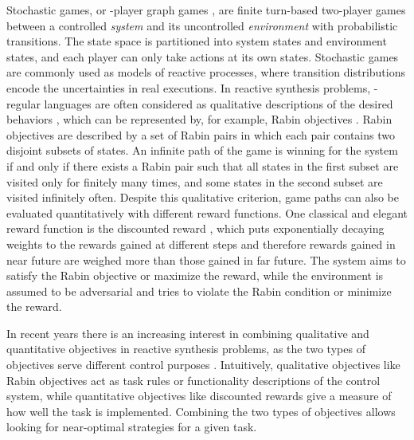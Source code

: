 \documentclass[runningheads,a4paper]{llncs}
\begin{document}
Stochastic games, or -player graph games \cite{chatterjee2012survey}, are finite turn-based two-player games between a controlled \emph{system} and its uncontrolled \emph{environment} with probabilistic transitions. The state space is partitioned into system states and environment states, and each player can only take actions at its own states. Stochastic games are commonly used as models of reactive processes, where transition distributions encode the uncertainties in real executions. In reactive synthesis problems, -regular languages are often considered as qualitative descriptions of the desired behaviors \cite{kress2007s}, which can be represented by, for example, Rabin objectives \cite{thomas1997languages}. Rabin objectives are described by a set of Rabin pairs in which each pair contains two disjoint subsets of states. An infinite path of the game is winning for the system if and only if there exists a Rabin pair such that all states in the first subset are visited only for finitely many times, and some states in the second subset are visited infinitely often. Despite this qualitative criterion, game paths can also be evaluated quantitatively with different reward functions. One classical and elegant reward function is the discounted reward \cite{shapley1953stochastic, littman1994markov, filar1996competitive}, which puts exponentially decaying weights to the rewards gained at different steps and therefore rewards gained in near future are weighed more than those gained in far future. The system aims to satisfy the Rabin objective or maximize the reward, while the environment is assumed to be adversarial and tries to violate the Rabin condition or minimize the reward.

In recent years there is an increasing interest in combining qualitative and quantitative objectives in reactive synthesis problems, as the two types of objectives serve different control purposes \cite{bloem2009better, chen2013synthesis, chatterjee2005mean, chatterjee2014perfect}. Intuitively, qualitative objectives like Rabin objectives act as task rules or functionality descriptions of the control system, while quantitative objectives like discounted rewards give a measure of how well the task is implemented. Combining the two types of objectives allows looking for near-optimal strategies for a given task.
\end{document}
